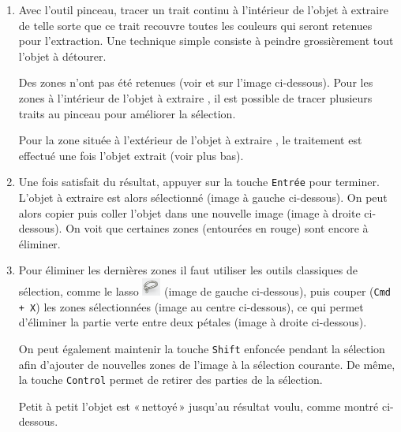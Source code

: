 \begin{enumerate}
\item Avec l'outil pinceau, tracer un trait continu à l'intérieur de l'objet à extraire de telle sorte que ce trait recouvre toutes les couleurs qui seront retenues pour l'extraction. Une technique simple consiste à peindre grossièrement tout l'objet à détourer.

\vspace{6pt}

Des zones n'ont pas été retenues (voir  et  sur l'image ci-dessous). Pour les zones à l'intérieur de l'objet à extraire , il est possible de tracer plusieurs traits au pinceau pour améliorer la sélection.


Pour la zone située à l'extérieur de l'objet à extraire , le traitement est effectué une fois l'objet extrait (voir plus bas).


\item Une fois satisfait du résultat, appuyer sur la touche \texttt{Entrée} pour terminer. L'objet à extraire est alors sélectionné (image à gauche ci-dessous). On peut alors copier puis coller l'objet dans une nouvelle image (image à droite ci-dessous). On voit que certaines zones (entourées en rouge) sont encore à éliminer.


\item Pour éliminer les dernières zones il faut utiliser les outils classiques de sélection, comme le lasso \includegraphics[width=.7cm]{./images/image03/outilLasso} (image de gauche ci-dessous), puis couper (\texttt{Cmd + X}) les zones sélectionnées (image au centre ci-dessous), ce qui permet d'éliminer la partie verte entre deux pétales (image à droite ci-dessous).

\vspace{6pt}

On peut également maintenir la touche \texttt{Shift} enfoncée pendant la sélection afin d'ajouter de nouvelles zones de l'image à la sélection courante. De même, la touche \texttt{Control} permet de retirer des parties de la sélection.


Petit à petit l'objet est «\,nettoyé\,» jusqu'au résultat voulu, comme montré ci-dessous.


\end{enumerate}




